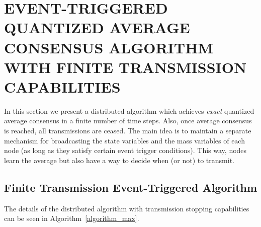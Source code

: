 \documentclass[twocolumn]{autart}    %
\begin{document}
%
%
%
%
\section{EVENT-TRIGGERED QUANTIZED AVERAGE CONSENSUS ALGORITHM WITH FINITE TRANSMISSION CAPABILITIES}\label{MaxAlgorithm}


In this section we present a distributed algorithm which achieves \textit{exact} quantized average consensus in a finite number of time steps. 
Also, once average consensus is reached, all transmissions are ceased. 
The main idea is to maintain a separate mechanism for broadcasting the state variables and the mass variables of each node (as long as they satisfy certain event trigger conditions). 
This way, nodes learn the average but also have a way to decide when (or not) to transmit. 


\subsection{Finite Transmission Event-Triggered Algorithm}

The details of the distributed algorithm with transmission stopping capabilities can be seen in Algorithm~\ref{algorithm_max}. 
\end{document}
